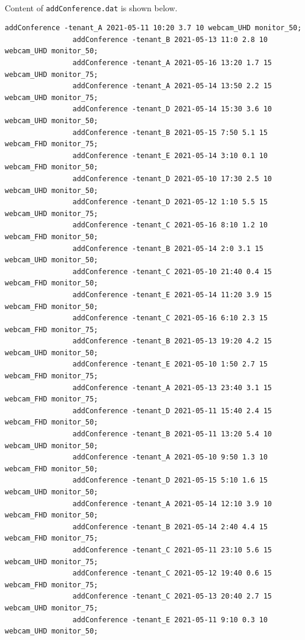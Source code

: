 \documentclass{article}
\begin{document}
            \paragraph{}
            Content of \texttt{addConference.dat} is shown below.
            \begin{Verbatim}[gobble=8]
                addConference -tenant_A 2021-05-11 10:20 3.7 10 webcam_UHD monitor_50;
                addConference -tenant_B 2021-05-13 11:0 2.8 10 webcam_UHD monitor_50;
                addConference -tenant_A 2021-05-16 13:20 1.7 15 webcam_UHD monitor_75;
                addConference -tenant_A 2021-05-14 13:50 2.2 15 webcam_UHD monitor_75;
                addConference -tenant_D 2021-05-14 15:30 3.6 10 webcam_UHD monitor_50;
                addConference -tenant_B 2021-05-15 7:50 5.1 15 webcam_FHD monitor_75;
                addConference -tenant_E 2021-05-14 3:10 0.1 10 webcam_FHD monitor_50;
                addConference -tenant_D 2021-05-10 17:30 2.5 10 webcam_UHD monitor_50;
                addConference -tenant_D 2021-05-12 1:10 5.5 15 webcam_UHD monitor_75;
                addConference -tenant_C 2021-05-16 8:10 1.2 10 webcam_FHD monitor_50;
                addConference -tenant_B 2021-05-14 2:0 3.1 15 webcam_UHD monitor_50;
                addConference -tenant_C 2021-05-10 21:40 0.4 15 webcam_FHD monitor_50;
                addConference -tenant_E 2021-05-14 11:20 3.9 15 webcam_FHD monitor_50;
                addConference -tenant_C 2021-05-16 6:10 2.3 15 webcam_FHD monitor_75;
                addConference -tenant_B 2021-05-13 19:20 4.2 15 webcam_UHD monitor_50;
                addConference -tenant_E 2021-05-10 1:50 2.7 15 webcam_FHD monitor_75;
                addConference -tenant_A 2021-05-13 23:40 3.1 15 webcam_FHD monitor_75;
                addConference -tenant_D 2021-05-11 15:40 2.4 15 webcam_FHD monitor_50;
                addConference -tenant_B 2021-05-11 13:20 5.4 10 webcam_UHD monitor_50;
                addConference -tenant_A 2021-05-10 9:50 1.3 10 webcam_FHD monitor_50;
                addConference -tenant_D 2021-05-15 5:10 1.6 15 webcam_UHD monitor_50;
                addConference -tenant_A 2021-05-14 12:10 3.9 10 webcam_FHD monitor_50;
                addConference -tenant_B 2021-05-14 2:40 4.4 15 webcam_FHD monitor_75;
                addConference -tenant_C 2021-05-11 23:10 5.6 15 webcam_UHD monitor_75;
                addConference -tenant_C 2021-05-12 19:40 0.6 15 webcam_FHD monitor_75;
                addConference -tenant_C 2021-05-13 20:40 2.7 15 webcam_UHD monitor_75;
                addConference -tenant_E 2021-05-11 9:10 0.3 10 webcam_UHD monitor_50;

\end{Verbatim}
\end{document}

